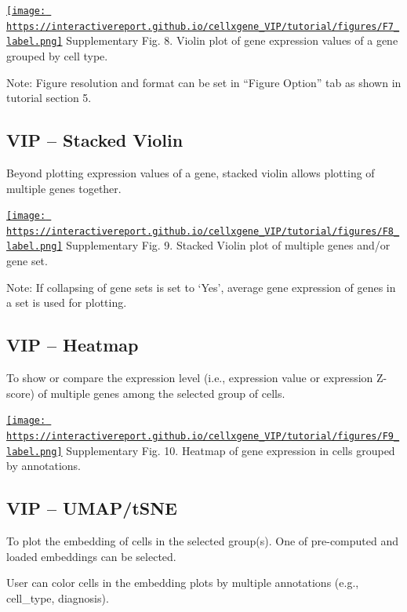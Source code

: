 \documentclass[
]{article}
\begin{document}
\href{https://interactivereport.github.io/cellxgene_VIP/tutorial/figures/F7_label.png}{\texttt{[image: https://interactivereport.github.io/cellxgene\_VIP/tutorial/figures/F7\_label.png]}}
Supplementary Fig. 8. Violin plot of gene expression values of a gene grouped by cell type.

Note: Figure resolution and format can be set in ``Figure Option'' tab as shown in tutorial section 5.

\hypertarget{vip-stacked-violin}{%
\subsection{VIP -- Stacked Violin}\label{vip-stacked-violin}}

Beyond plotting expression values of a gene, stacked violin allows plotting of multiple genes together.

\href{https://interactivereport.github.io/cellxgene_VIP/tutorial/figures/F8_label.png}{\texttt{[image: https://interactivereport.github.io/cellxgene\_VIP/tutorial/figures/F8\_label.png]}}
Supplementary Fig. 9. Stacked Violin plot of multiple genes and/or gene set.

Note: If collapsing of gene sets is set to `Yes', average gene expression of genes in a set is used for plotting.

\hypertarget{vip-heatmap}{%
\subsection{VIP -- Heatmap}\label{vip-heatmap}}

To show or compare the expression level (i.e., expression value or expression Z-score) of multiple genes among the selected group of cells.

\href{https://interactivereport.github.io/cellxgene_VIP/tutorial/figures/F9_label.png}{\texttt{[image: https://interactivereport.github.io/cellxgene\_VIP/tutorial/figures/F9\_label.png]}}
Supplementary Fig. 10. Heatmap of gene expression in cells grouped by annotations.

\hypertarget{vip-umaptsne}{%
\subsection{VIP -- UMAP/tSNE}\label{vip-umaptsne}}

To plot the embedding of cells in the selected group(s). One of pre-computed and loaded embeddings can be selected.

User can color cells in the embedding plots by multiple annotations (e.g., cell\_type, diagnosis).
\end{document}
